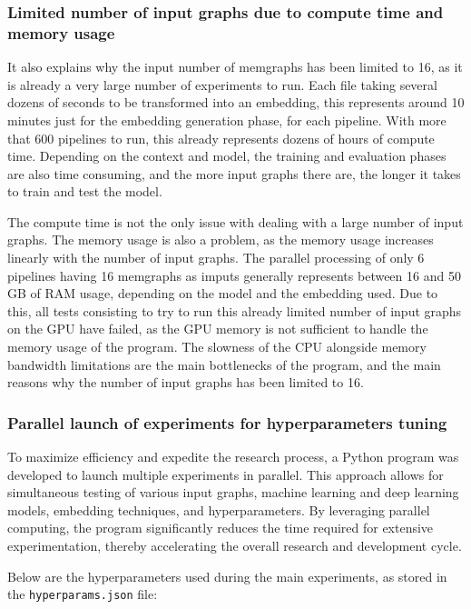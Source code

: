 \subsubsection{Limited number of input graphs due to compute time and memory usage}

It also explains why the input number of memgraphs has been limited to 16, as it is already a very large number of experiments to run. Each file taking several dozens of seconds to be transformed into an embedding, this represents around 10 minutes just for the embedding generation phase, for each pipeline. With more that 600 pipelines to run, this already represents dozens of hours of compute time. Depending on the context and model, the training and evaluation phases are also time consuming, and the more input graphs there are, the longer it takes to train and test the model. 

The compute time is not the only issue with dealing with a large number of input graphs. The memory usage is also a problem, as the memory usage increases linearly with the number of input graphs. The parallel processing of only 6 pipelines having 16 memgraphs as imputs generally represents between 16 and 50 GB of RAM usage, depending on the model and the embedding used. Due to this, all tests consisting to try to run this already limited number of input graphs on the GPU have failed, as the GPU memory is not sufficient to handle the memory usage of the program. The slowness of the CPU alongside memory bandwidth limitations are the main bottlenecks of the program, and the main reasons why the number of input graphs has been limited to 16.

\subsubsection{Parallel launch of experiments for hyperparameters tuning}

To maximize efficiency and expedite the research process, a Python program was developed to launch multiple experiments in parallel. This approach allows for simultaneous testing of various input graphs, machine learning and deep learning models, embedding techniques, and hyperparameters. By leveraging parallel computing, the program significantly reduces the time required for extensive experimentation, thereby accelerating the overall research and development cycle.

Below are the hyperparameters used during the main experiments, as stored in the \texttt{hyperparams.json} file:

